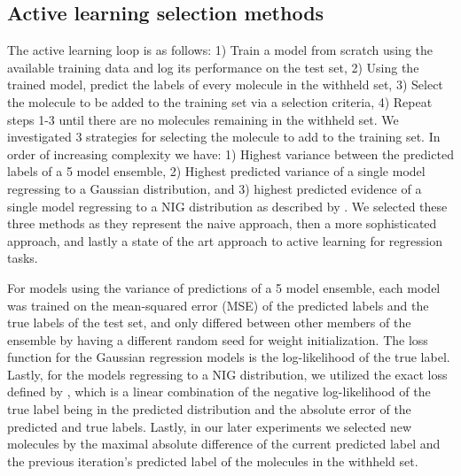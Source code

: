 \documentclass[journal=jmcmar,manuscript=article]{achemso}
\begin{document}
\subsection{Active learning selection methods}
The active learning loop is as follows: 1) Train a model from scratch using the available training data and log its performance on the test set, 2) Using the trained model, predict the labels of every molecule in the withheld set, 3) Select the molecule to be added to the training set via a selection criteria, 4) Repeat steps 1-3 until there are no molecules remaining in the withheld set. We investigated 3 strategies for selecting the molecule to add to the training set. In order of increasing complexity we have: 1) Highest variance between the predicted labels of a 5 model ensemble, 2) Highest predicted variance of a single model regressing to a Gaussian distribution, and 3) highest predicted evidence of a single model regressing to a NIG distribution as described by \citet{alnigregress}. We selected these three methods as they represent the naive approach, then a more sophisticated approach, and lastly a state of the art approach to active learning for regression tasks.

For models using the variance of predictions of a 5 model ensemble, each model was trained on the mean-squared error (MSE) of the predicted labels and the true labels of the test set, and only differed between other members of the ensemble by having a different random seed for weight initialization. The loss function for the Gaussian regression models is the log-likelihood of the true label. Lastly, for the models regressing to a NIG distribution, we utilized the exact loss defined by \citet{alnigregress}, which is a linear combination of the negative log-likelihood of the true label being in the predicted distribution and the absolute error of the predicted and true labels. Lastly, in our later experiments we selected new molecules by the maximal absolute difference of the current predicted label and the previous iteration's predicted label of the molecules in the withheld set.
\end{document}
